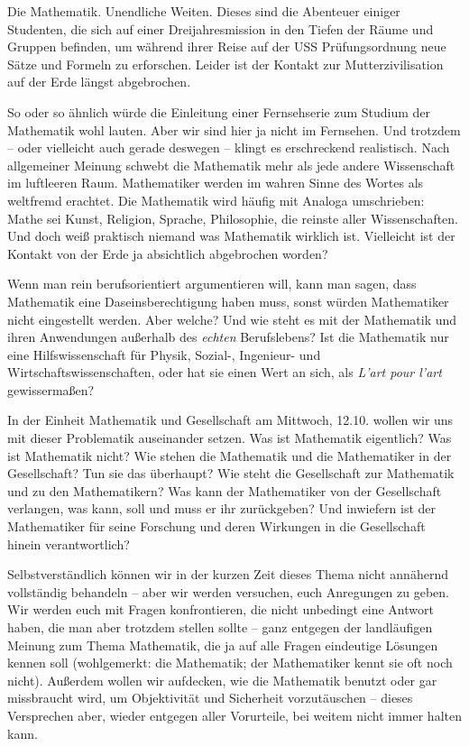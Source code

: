 \label{page:mug}
Die Mathematik. Unendliche Weiten. Dieses sind die Abenteuer einiger
Studenten, die sich auf einer Dreijahresmission in den Tiefen der Räume und
Gruppen befinden, um während ihrer Reise auf der USS Prüfungsordnung neue Sätze
und Formeln zu erforschen. Leider ist der Kontakt zur Mutterzivilisation auf
der Erde längst abgebrochen.

So oder so ähnlich würde die Einleitung einer Fernsehserie zum Studium der
Mathematik wohl lauten. Aber wir sind hier ja nicht im Fernsehen. Und trotzdem
-- oder vielleicht auch gerade deswegen -- klingt es erschreckend realistisch.
Nach allgemeiner Meinung schwebt die Mathematik mehr als jede andere
Wissenschaft im luftleeren Raum. Mathematiker werden im wahren Sinne des Wortes
als weltfremd erachtet. Die Mathematik wird häufig mit Analoga umschrieben:
Mathe sei Kunst, Religion, Sprache, Philosophie, die reinste aller
Wissenschaften. Und doch weiß praktisch niemand was Mathematik wirklich ist.
Vielleicht ist der Kontakt von der Erde ja absichtlich abgebrochen worden?

Wenn man rein berufsorientiert argumentieren will, kann man sagen, dass
Mathematik eine Daseinsberechtigung haben muss, sonst würden Mathematiker nicht
eingestellt werden. Aber welche? Und wie steht es mit der Mathematik und ihren
Anwendungen außerhalb des \emph{echten} Berufslebens? Ist die Mathematik nur
eine Hilfswissenschaft für Physik, Sozial-, Ingenieur- und
Wirtschaftswissenschaften, oder hat sie einen Wert an sich, als \emph{L'art
pour l'art} gewissermaßen?

In der Einheit Mathematik und Gesellschaft am Mittwoch, 12.10. wollen wir uns
mit dieser Problematik auseinander setzen. Was ist Mathematik eigentlich? Was
ist Mathematik nicht? Wie stehen die Mathematik und die Mathematiker in der
Gesellschaft? Tun sie das überhaupt? Wie steht die Gesellschaft zur Mathematik
und zu den Mathematikern? Was kann der Mathematiker von der Gesellschaft
verlangen, was kann, soll und muss er ihr zurückgeben? Und inwiefern ist der
Mathematiker für seine Forschung und deren Wirkungen in die Gesellschaft hinein
verantwortlich?

Selbstverständlich können wir in der kurzen Zeit dieses Thema nicht annähernd
vollständig behandeln -- aber wir werden versuchen, euch Anregungen zu geben.
Wir werden euch mit Fragen konfrontieren, die nicht unbedingt eine Antwort
haben, die man aber trotzdem stellen sollte -- ganz entgegen der landläufigen
Meinung zum Thema Mathematik, die ja auf alle Fragen eindeutige Lösungen kennen
soll (wohlgemerkt: die Mathematik; der Mathematiker kennt sie oft noch nicht).
Außerdem wollen wir aufdecken, wie die Mathematik benutzt oder gar missbraucht
wird, um Objektivität und Sicherheit vorzutäuschen -- dieses Versprechen aber,
wieder entgegen aller Vorurteile, bei weitem nicht immer halten kann.

